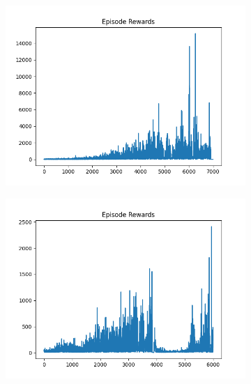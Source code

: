 \begin{figure}[H]
\begin{subfigure}{.47\linewidth}
        \includegraphics[width=\textwidth]{pole/2024-06-15_00-29-02_dqn_cartpole_episode_rewards.png}
    \end{subfigure}
    \begin{subfigure}{.47\linewidth}
        \centering
        \includegraphics[width=\textwidth]{pole/2024-06-14_19-20-40_dqn_cartpole_episode_rewards.png}
    \end{subfigure}
\end{figure}
